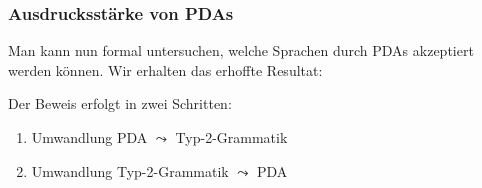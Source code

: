 \documentclass[onlymath]{beamer}
\begin{document}
\begin{frame}\frametitle{Ausdrucksstärke von PDAs}

Man kann nun formal untersuchen, welche Sprachen durch PDAs akzeptiert werden können.
Wir erhalten das erhoffte Resultat:\medskip

\pause\bigskip

Der Beweis erfolgt in zwei Schritten:
\begin{enumerate}[(1)]
\item Umwandlung PDA $\leadsto$ Typ-2-Grammatik
\item Umwandlung Typ-2-Grammatik $\leadsto$ PDA
\end{enumerate}

\end{frame}
\end{document}
